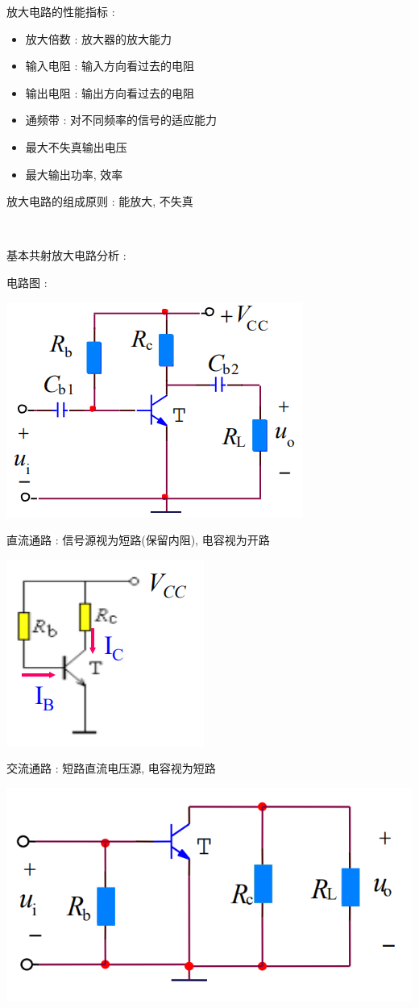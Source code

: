 \documentclass[UTF8, 12pt]{ctexart}
\begin{document}
	\noindent
	放大电路的性能指标 :
	\begin{itemize}[leftmargin = 4em]
		\item 放大倍数 : 放大器的放大能力
		\item 输入电阻 : 输入方向看过去的电阻
		\item 输出电阻 : 输出方向看过去的电阻
		\item 通频带 : 对不同频率的信号的适应能力
		\item 最大不失真输出电压
		\item 最大输出功率, 效率
	\end{itemize}

	放大电路的组成原则 : 能放大, 不失真

	~

	\noindent
	基本共射放大电路分析 :

	电路图 :

	\includegraphics[scale = 0.4]{02/基本共射放大电路电路图.png}

	直流通路 : 信号源视为短路(保留内阻), 电容视为开路

	\includegraphics[scale = 0.4]{02/基本共射放大电路直流通路.png}

	交流通路 : 短路直流电压源, 电容视为短路

	\includegraphics[scale = 0.4]{02/基本共射放大电路交流通路.png}
\end{document}
